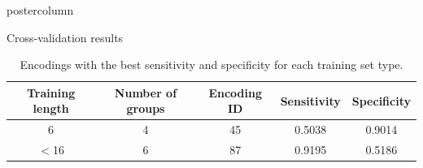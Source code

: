 \documentclass[final]{beamer}\usepackage[]{graphicx}\usepackage[]{color}
\begin{document}
\begin{frame}
\begin{columns}
\begin{column}{.525\textwidth}
\begin{beamercolorbox}[center,wd=\textwidth]{postercolumn}
\begin{minipage}[T]{.95\textwidth}
{%

\begin{block}{Cross-validation results}
\begin{table}[ht]
\centering
\caption{Encodings with the best sensitivity and specificity for each training set type.} 
\begin{tabular}{c|c|c|c|c}
  \toprule
Training length & Number of groups & Encoding ID & Sensitivity & Specificity \\ 
  \midrule
6 & 4 & 45 & 0.5038 & 0.9014 \\ 
   \rowcolor[gray]{0.75}$<$16 & 6 & 87 & 0.9195 & 0.5186 \\ 
   \bottomrule
\end{tabular}
\end{table}




\end{block}}
\end{minipage}
\end{beamercolorbox}
\end{column}
\end{columns}
\end{frame}
\end{document}
